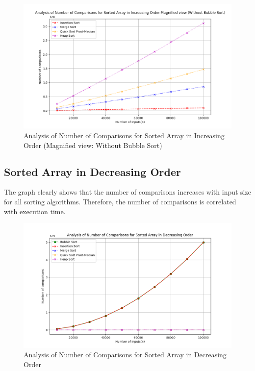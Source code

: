 \documentclass[a4paper,12pt]{report}
\begin{document}
\begin{figure}[H]
	\centering
	\includegraphics[width=.9\textwidth]{./Comparison_Sorted_Magnified.png}
	\caption{Analysis of Number of Comparisons for  Sorted Array in Increasing Order (Magnified view: Without Bubble Sort)}
	\label{fig:Comparisonsortingmagnified}
\end{figure}
\subsection{Sorted Array in Decreasing  Order}
The graph clearly shows that the number of comparisons increases with input size for all sorting algorithms. Therefore, the number of comparisons is correlated with execution time.
\begin{figure}[H]
	\centering
	\includegraphics[width=.9\textwidth]{./Comparison_Decreasing.png}
	\caption{Analysis of Number of Comparisons for  Sorted Array in Decreasing Order}
	\label{fig:ComparisonDecreasing}
\end{figure}
\end{document}

